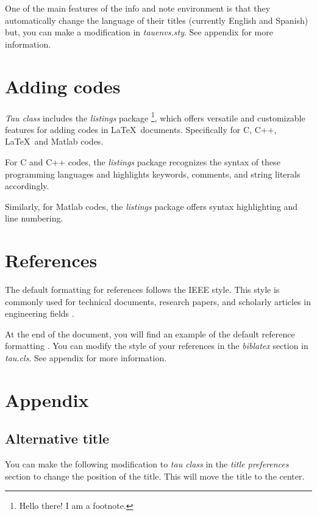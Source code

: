 \documentclass[9pt,a4paper,twoside]{tau}
\begin{document}
    One of the main features of the info and note environment is that they automatically change the language of their titles (currently English and Spanish) but, you can make a modification in \textit{tauenvs.sty}. See appendix for more information.

\section{Adding codes}

    \textit{Tau class} includes the \textit{listings} package \footnote{Hello there! I am a footnote.}, which offers versatile and customizable features for adding codes in \LaTeX\ documents. Specifically for C, C++, \LaTeX\ and Matlab codes. 

    For C and C++ codes, the \textit{listings} package recognizes the syntax of these programming languages and highlights keywords, comments, and string literals accordingly.

    Similarly, for Matlab codes, the \textit{listings} package offers syntax highlighting and line numbering.
    
    

\section{References}

    The default formatting for references follows the IEEE style. This style is commonly used for technical documents, research papers, and scholarly articles in engineering fields \cite{einstein}.

    At the end of the document, you will find an example of the default reference formatting \cite{dirac}. You can modify the style of your references in the \textit{biblatex} section in \textit{tau.cls}. See appendix for more information.
    
\section{Appendix}

    \subsection{Alternative title}

         You can make the following modification to \textit{tau class} in the \textit{title preferences} section to change the position of the title. This will move the title to the center. 
\end{document}
